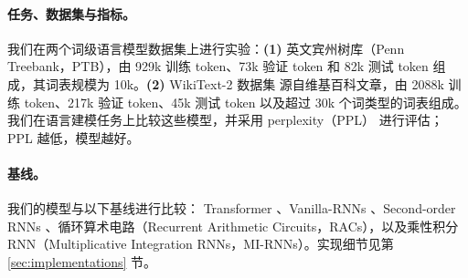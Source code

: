 \paragraph{任务、数据集与指标。} 我们在两个词级语言模型数据集上进行实验：\textbf{(1)} 英文宾州树库（Penn Treebank，PTB）\citep{marcinkiewicz1994building}，由 929k 训练 token、73k 验证 token 和 82k 测试 token 组成，其词表规模为 10k。\textbf{(2)} WikiText-2 数据集 \citep{merity2016pointer} 源自维基百科文章，由 2088k 训练 token、217k 验证 token、45k 测试 token 以及超过 30k 个词类型的词表组成。我们在语言建模任务上比较这些模型，并采用 perplexity（PPL）\citep{meister-cotterell-2021-language} 进行评估；PPL 越低，模型越好。


\paragraph{基线。} 我们的模型与以下基线进行比较：
  Transformer \citep{vaswani2017attention}、Vanilla-RNNs \citep{mikolov2012context}、Second-order RNNs \citep{hochreiter1997long}、循环算术电路（Recurrent Arithmetic Circuits，RACs）\citep{levine2018benefits}，以及乘性积分 RNN（Multiplicative Integration RNNs，MI-RNNs）\citep{wu_multiplicative_2016}。实现细节见第 \ref{sec:implementations} 节。







